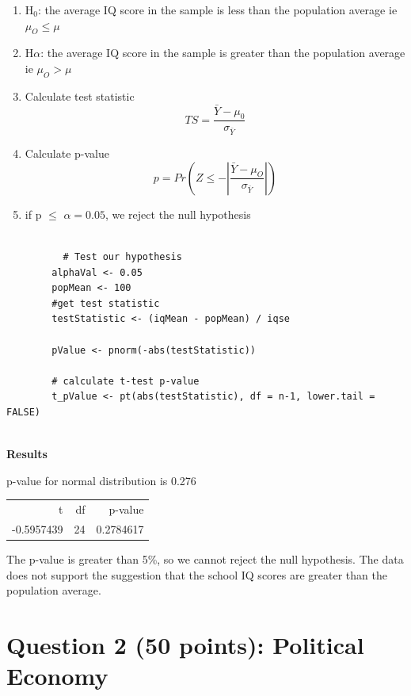 \documentclass[12pt,letterpaper]{article}
\begin{document}
\begin{enumerate}
\begin{enumerate}
		    \item H$_0$: the average IQ score in the sample is less than the population average
		    ie $\mu_O \le \mu$
		    \item H$\alpha$: the average IQ score in the sample is greater than the population average  ie $\mu_O > \mu$
		    \item Calculate test statistic  
		    \[TS = \frac{\bar{Y}  - \mu_0 }{\sigma_{\bar{Y}}}\]
		    \item  Calculate p-value 
		    \[p = Pr( Z \le - |\frac{\bar{Y}  - \mu_O }{\sigma_{\bar{Y}}} |)\]
		    
		    \item if p $\le$ $\alpha=0.05$, we reject the null hypothesis
		    
		  \end{enumerate}
		  
		  \noindent

		  \begin{verbatim} 

  		  # Test our hypothesis
        alphaVal <- 0.05
        popMean <- 100
        #get test statistic
        testStatistic <- (iqMean - popMean) / iqse
                  
        pValue <- pnorm(-abs(testStatistic))

        # calculate t-test p-value 
        t_pValue <- pt(abs(testStatistic), df = n-1, lower.tail = FALSE)


		  \end{verbatim} 

      \textbf{Results}

		  p-value for normal distribution is 0.276

      \begin{tabular}{r|r|r}
          t & df  & p-value\\
 -0.5957439 &24 &0.2784617\\
      \end{tabular}
        The p-value is greater than 5\%, so we cannot reject the null hypothesis. 
        The data does not support the suggestion that the school IQ scores are greater than the 
        population average.


	\end{enumerate}
	
	\newpage
	
	\section*{Question 2 (50 points): Political Economy}
	
\end{document}
